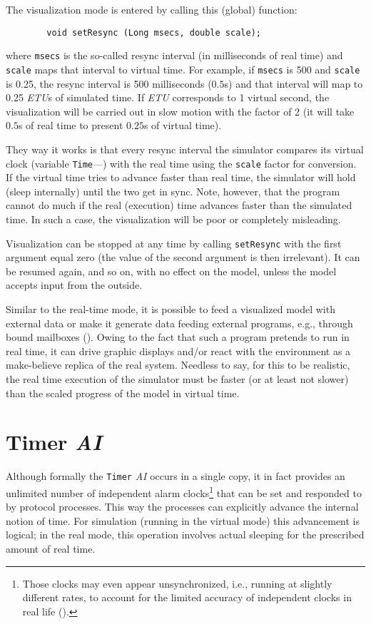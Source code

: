 The visualization mode is entered by calling this (global) function:
\begin{verbatim}
        void setResync (Long msecs, double scale);
\end{verbatim}
\noindent
where {\tt msecs} is the so-called resync interval (in milliseconds of real
time) and {\tt scale} maps that interval to virtual time.
For example, if {\tt msecs} is 500 and {\tt scale} is 0.25, the resync
interval is 500 milliseconds ($0.5$s) and that interval will map to
0.25 {\em ETU\/}s of simulated time. 
If {\em ETU\/} corresponds to 1 virtual second, the visualization will be
carried out in slow motion with the factor of 2 (it will take $0.5$s of real
time to present $0.25$s of virtual time).

They way it works is that every resync interval the simulator compares its
virtual clock (variable {\tt Time}---)
with the real time using the {\tt scale} factor for conversion.
If the virtual time tries to advance faster than real time, the simulator
will hold (sleep internally) until the two get in sync.
Note, however, that the program cannot do much if the real (execution)
time advances faster than the simulated time.
In such a case, the visualization will be poor or completely misleading.

Visualization can be stopped at any time by calling
{\tt setResync} with the first argument equal zero (the value of the second
argument is then irrelevant).
It can be resumed again, and so on, with no effect on the model, unless the
model accepts input from the outside.

Similar to the real-time mode, it is possible to feed a visualized model
with external data or make it generate data feeding external programs, e.g.,
through bound mailboxes ().
Owing to the fact that such a program pretends to run in real time, it can
drive graphic displays and/or react with the environment as a make-believe
replica of the real system.
Needless to say, for this to be realistic, the real time execution of the
simulator must be faster (or at least not slower) than the scaled progress
of the model in virtual time.

\section{Timer {\em AI}}
\label{rm_ti}

Although formally the {\tt Timer} {\em AI\/} occurs
in a single copy, it in fact provides an unlimited number of independent
alarm clocks\footnote{Those clocks may even appear unsynchronized, i.e.,
running at slightly different rates, to account for the limited accuracy of
independent clocks in real life ().}
that can be set and responded to by protocol processes.
This way the processes can explicitly advance the internal notion of time.
For simulation (running in the virtual mode) this advancement is logical;
in the real mode, this operation involves actual sleeping for the prescribed
amount of real time.

